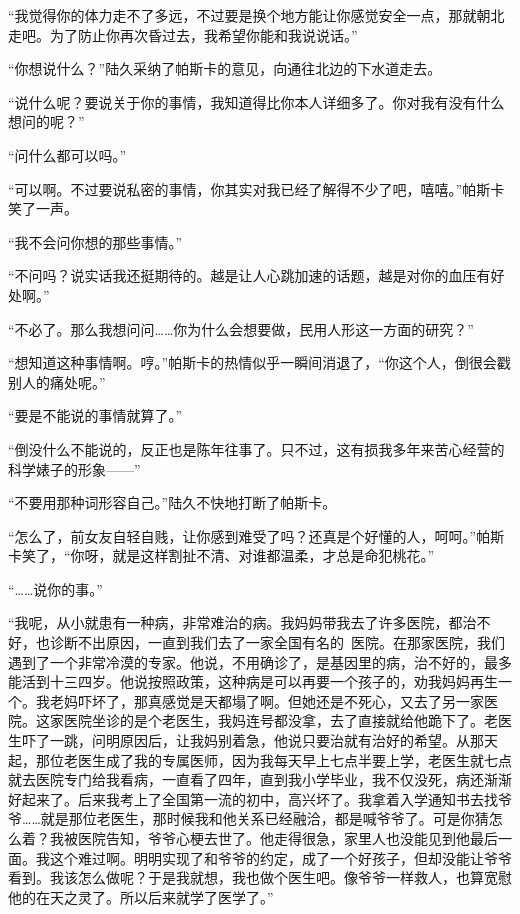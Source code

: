 “我觉得你的体力走不了多远，不过要是换个地方能让你感觉安全一点，那就朝北走吧。为了防止你再次昏过去，我希望你能和我说说话。”

“你想说什么？”陆久采纳了帕斯卡的意见，向通往北边的下水道走去。

“说什么呢？要说关于你的事情，我知道得比你本人详细多了。你对我有没有什么想问的呢？”

“问什么都可以吗。”

“可以啊。不过要说私密的事情，你其实对我已经了解得不少了吧，嘻嘻。”帕斯卡笑了一声。

“我不会问你想的那些事情。”

“不问吗？说实话我还挺期待的。越是让人心跳加速的话题，越是对你的血压有好处啊。”

“不必了。那么我想问问……你为什么会想要做，民用人形这一方面的研究？”

“想知道这种事情啊。哼。”帕斯卡的热情似乎一瞬间消退了，“你这个人，倒很会戳别人的痛处呢。”

“要是不能说的事情就算了。”

“倒没什么不能说的，反正也是陈年往事了。只不过，这有损我多年来苦心经营的科学婊子的形象——”

“不要用那种词形容自己。”陆久不快地打断了帕斯卡。

“怎么了，前女友自轻自贱，让你感到难受了吗？还真是个好懂的人，呵呵。”帕斯卡笑了，“你呀，就是这样割扯不清、对谁都温柔，才总是命犯桃花。”

“……说你的事。”

“我呢，从小就患有一种病，非常难治的病。我妈妈带我去了许多医院，都治不好，也诊断不出原因，一直到我们去了一家全国有名的 医院。在那家医院，我们遇到了一个非常冷漠的专家。他说，不用确诊了，是基因里的病，治不好的，最多能活到十三四岁。他说按照政策，这种病是可以再要一个孩子的，劝我妈妈再生一个。我老妈吓坏了，那真感觉是天都塌了啊。但她还是不死心，又去了另一家医院。这家医院坐诊的是个老医生，我妈连号都没拿，去了直接就给他跪下了。老医生吓了一跳，问明原因后，让我妈别着急，他说只要治就有治好的希望。从那天起，那位老医生成了我的专属医师，因为我每天早上七点半要上学，老医生就七点就去医院专门给我看病，一直看了四年，直到我小学毕业，我不仅没死，病还渐渐好起来了。后来我考上了全国第一流的初中，高兴坏了。我拿着入学通知书去找爷爷……就是那位老医生，那时候我和他关系已经融洽，都是喊爷爷了。可是你猜怎么着？我被医院告知，爷爷心梗去世了。他走得很急，家里人也没能见到他最后一面。我这个难过啊。明明实现了和爷爷的约定，成了一个好孩子，但却没能让爷爷看到。我该怎么做呢？于是我就想，我也做个医生吧。像爷爷一样救人，也算宽慰他的在天之灵了。所以后来就学了医学了。”

